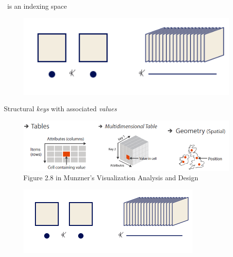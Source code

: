 \documentclass[xcolor={dvipsnames}, handout]{beamer}
\begin{document}
\begin{frame}{\dbase\ is an indexing space}
    \begin{figure}[H]
        \includegraphics[width=1\textwidth]{figures/math/base.png}
    \label{fig:base_example}
    \end{figure}
\end{frame}

\begin{frame}{Structural \textit{keys} with associated \textit{values} \cite{munznerVisualizationAnalysisDesign2014}}
\begin{figure}
    \includegraphics[width=1\textwidth]{figures/intro/munzner_datatypes.png}
    \caption{Figure 2.8 in Munzner's Visualization Analysis and Design\cite{munznerVisualizationAnalysisDesign2014}}
\end{figure}
\pause
\begin{figure}[H]
    \includegraphics[width=.5\textheight]{figures/math/base.png}
    \label{fig:base_example}
\end{figure}
\end{frame}
\end{document}
